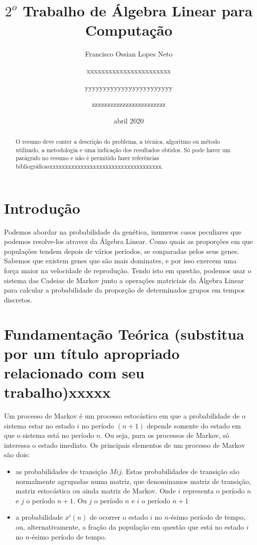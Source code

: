 \documentclass[a4paper,12pt]{article}
\title{$2^o$ Trabalho de Álgebra Linear para Computação}
\author{
  Francisco Ossian Lopes Neto\\
  \and
  xxxxxxxxxxxxxxxxxxxxxxx\\
  \and
  yyyyyyyyyyyyyyyyyyyyyyyy\\
  \and
  zzzzzzzzzzzzzzzzzzzzzzzz\\
  \and
}
\date{abril 2020}
\begin{document}
\maketitle

\begin{abstract}
O resumo deve conter a descrição do problema, a técnica, algoritmo ou método utilizado, a metodologia e uma indicação dos resultados obtidos. Só pode haver um parágrafo no resumo e não é permitido fazer referências bibliográficasxxxxxxxxxxxxxxxxxxxxxxxxxxxxxxxxxxxx.
\end{abstract}


\section{Introdução}
\label{sec:introducao}

Podemos abordar na probabilidade da genética, inumeros casos peculiares que podemos resolve-los atravez da Álgebra Linear. Como quais as proporções em que populações tendem depois de vários períodos, se conparadas pelos seus genes. Sabemos que existem genes que são mais dominates, e por isso exercem uma força maior na velocidade de reprodução. Tendo isto em questão, podemos usar o sistema das Cadeias de Markov junto a operações matriciais da Álgebra Linear para calcular a probabilidade da proporção de determinados grupos em tempos discretos. 


\section{Fundamentação Teórica (substitua por um título apropriado relacionado com seu trabalho)xxxxx}
\label{sec:fundamentacao}

Um processo de Markov é um processo estocástico em que a probabilidade de o sistema estar no estado $i$ no período $(n+1)$ depende somente do estado em que o sistema está no período $n$. Ou seja, para os processos de Markov, só interessa o estado imediato. Os principais elementos de um processo de Markov são dois:

\begin{itemize}

\item as probabilidades de transição $Mij$. Estas probabilidades de transição são normalmente agrupadas numa matriz, que denominamos matriz de transição, matriz estocástica ou ainda matriz de Markov. Onde $i$ representa o período $n$ e $j$ o período $n+1$. Ou $j$ o período $n$ e $i$ o período $n+1$

\item a probabilidade $x^i(n)$ de ocorrer o estado $i$ no $n$-ésimo período de tempo, ou, alternativamente, a fração da população em questão que está no estado $i$ no $n$-ésimo período de tempo.

\end{itemize}
\end{document}
